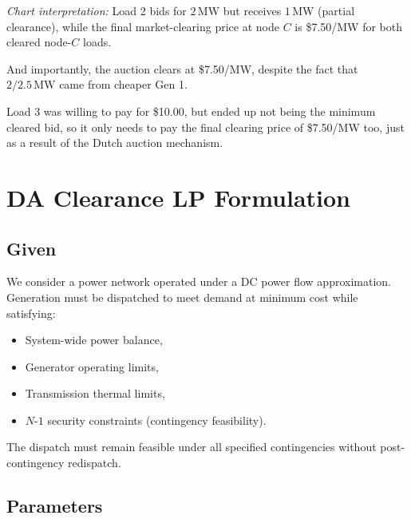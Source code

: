 \documentclass[11pt]{article}
\begin{document}
\textit{Chart interpretation:} Load 2 bids for $2\,\mathrm{MW}$ but receives $1\,\mathrm{MW}$ (partial clearance), while the final market-clearing price at node $C$ is \$7.50/MW for both cleared node-$C$ loads.

And importantly, the auction clears at \$7.50/MW, despite the fact that $2/2.5\,\mathrm{MW}$ came from cheaper Gen 1.

Load 3 was willing to pay for \$10.00, but ended up not being the minimum cleared bid, so it only needs to pay the final clearing price of \$7.50/MW too, just as a result of the Dutch auction mechanism.

\newpage

\section{DA Clearance LP Formulation}

\subsection{Given}

We consider a power network operated under a DC power flow approximation.
Generation must be dispatched to meet demand at minimum cost while satisfying:

\begin{itemize}
    \item System-wide power balance,
    \item Generator operating limits,
    \item Transmission thermal limits,
    \item $N$-$1$ security constraints (contingency feasibility).
\end{itemize}

The dispatch must remain feasible under all specified contingencies without post-contingency redispatch.

\subsection{Parameters}
\end{document}
